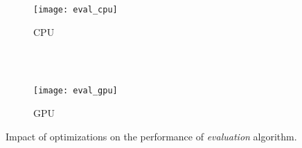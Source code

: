 \begin{figure}[t]
  \begin{subfigure}[b]{1\linewidth}
    \centering
    \texttt{[image: eval\_cpu]} \\
    \caption{CPU}
  \end{subfigure}
  \\ \\
  \begin{subfigure}[b]{1\linewidth}
    \centering
    \texttt{[image: eval\_gpu]}
    \caption{GPU}
  \end{subfigure}
  \caption{Impact of optimizations on the performance of \textit{evaluation} algorithm.}
  \label{fig:eval_results}
\end{figure}

